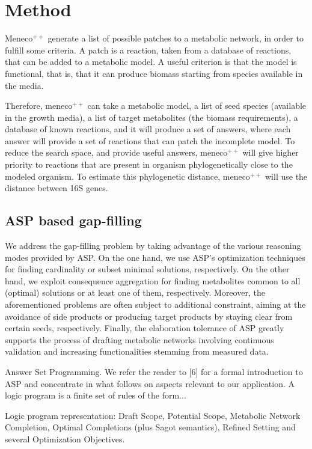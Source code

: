 \documentclass{article}
\newcommand{\Meneco}{Meneco$^{++}$\xspace}
\newcommand{\meneco}{meneco$^{++}$\xspace}
\begin{document}
\section{Method}

\Meneco generate a list of possible patches to a metabolic network, in order to fulfill some criteria. A patch is a reaction, taken from a database of reactions, that can be added to a metabolic model. A useful criterion is that the model is functional, that is, that it can produce biomass starting from species available in the media.

Therefore, \meneco can take a metabolic model, a list of seed species (available in the growth media), a list of target metabolites (the biomass requirements), a database of known reactions, and it will produce a set of answers, where each answer will provide a set of reactions that can patch the incomplete model.
To reduce the search space, and provide useful answers, \meneco will give higher priority to reactions that are present in organism phylogenetically close to the modeled organism. To estimate this phylogenetic distance, \meneco will use the distance between 16S genes.


\subsection{ASP based gap-filling}


We address the gap-filling problem by taking advantage of the various reasoning modes provided by ASP. On the one hand, we use ASP’s optimization techniques for finding cardinality or subset minimal solutions, respectively. On the other hand, we exploit consequence aggregation for finding metabolites common to all (optimal) solutions or at least one of them, respectively. Moreover, the aforementioned problems are often subject to additional constraint, aiming at the avoidance of side products or producing target products by staying clear from certain seeds, respectively. Finally, the elaboration tolerance of ASP greatly supports the process of drafting metabolic networks involving continuous validation and increasing functionalities stemming from measured data.


Answer Set Programming. We refer the reader to [6] for a formal introduction to ASP and concentrate in what follows on aspects relevant to our application. A logic program is a finite set of rules of the form...

Logic program representation: Draft Scope, Potential Scope, Metabolic Network Completion, Optimal Completions (plus Sagot semantics), Refined Setting and several Optimization Objectives.
\end{document}
